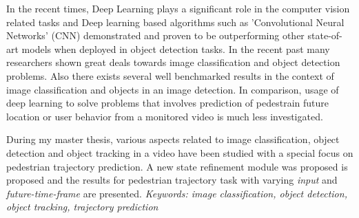 % 
% 
%

In the recent times, Deep Learning plays a significant role in the computer vision
related tasks and Deep learning based algorithms such as 'Convolutional Neural Networks'
(CNN) demonstrated and proven to be outperforming other state-of-art models when 
deployed in object detection tasks. In the recent past many researchers shown great 
deals towards image classification and object detection problems. Also there exists several 
well benchmarked results in the context of image classification and objects in an image detection.
In comparison, usage of deep learning to solve problems that involves prediction of pedestrain future location or user behavior from a monitored video is much less investigated.

\vspace{1em}
\noindent During my master thesis, various aspects related to image classification, object 
detection and object tracking in a video have been studied with a special focus on pedestrian trajectory prediction. 
A new state refinement module was proposed is proposed and the results for pedestrian trajectory 
task with varying \textit{input} and \textit{future-time-frame} are presented.
\baselineskip
\textit{Keywords: image classification, object detection, object tracking, trajectory prediction}
